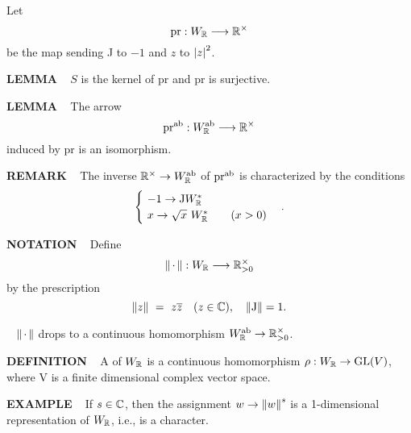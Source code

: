 Let 
\[
\text{pr}: W_{\mathbb{R}} \longrightarrow \mathbb{R}^\times
\]
be the map sending J to $-1$ and $z$ to $\left\vert z\right\vert^2$.
\vspace{0.2cm}

\begin{x}{\small\bf LEMMA} \ %
$S$ is the kernel of pr and pr is surjective.
\end{x}
\vspace{0.1cm}

\begin{x}{\small\bf LEMMA} \ %
The arrow 
\[
\text{pr}^{\text{ab}}: W_{\mathbb{R}}^{\text{ab}} \longrightarrow \mathbb{R}^\times
\]
induced by pr is an isomorphism.
\end{x}
\vspace{0.1cm}

\begin{x}{\small\bf REMARK} \ %
The inverse $\mathbb{R}^\times \rightarrow W_{\mathbb{R}}^{\text{ab}}$ of $\text{pr}^{\text{ab}}$ is characterized by the conditions 
\[
\begin{cases}
 \ -1 \rightarrow \text{J} W_{\mathbb{R}}^*\\
 \ x \rightarrow \sqrt{x} \ W_{\mathbb{R}}^* \qquad (x > 0)
\end{cases}
.
\]
\end{x}
\vspace{0.1cm}

\begin{x}{\small\bf NOTATION} \ %
Define
\[
\left\lVert \hspace{0.05cm} \cdot \hspace{0.05cm} \right\rVert : W_{\mathbb{R}} \longrightarrow \mathbb{R}_{>0}^\times
\]
by the prescription 
\[
\left\lVert z \right\rVert \ = \ z \overline{z} \quad (z \in \mathbb{C}), \quad \left\lVert \text{J} \right\rVert = 1.
\]
\end{x}
\vspace{0.1cm}

\begin{x}{\small\bf {}} \ %
$\left\lVert \hspace{0.05cm} \cdot \hspace{0.05cm} \right\rVert$ drops to a continuous homomorphism $W_{\mathbb{R}}^{\text{ab}} \rightarrow \mathbb{R}_{>0}^\times$.
\end{x}
\vspace{0.1cm}

\begin{x}{\small\bf DEFINITION} \ %
A 
of $W_{\mathbb{R}}$ is a continuous homomorphism 
$\rho:W_{\mathbb{R}} \rightarrow \text{GL}(V)$, where V is a finite dimensional complex vector space.
\end{x}
\vspace{0.1cm}

\begin{x}{\small\bf EXAMPLE} \ %
If $s \in \mathbb{C}$, then the assignment $w \rightarrow \left\lVert w \right\rVert^s$ is a 1-dimensional
representation of $W_{\mathbb{R}}$, i.e., is a character.
\end{x}
\vspace{0.1cm}

